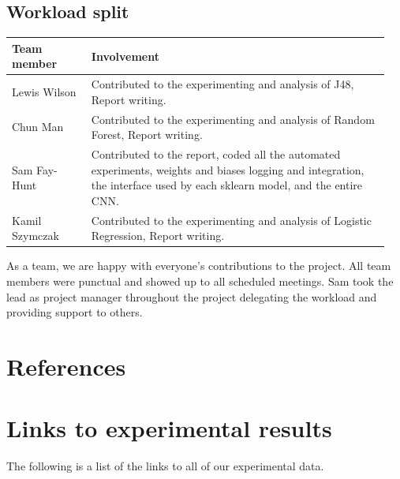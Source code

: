 \documentclass[11pt]{article}
\begin{document}
\subsection{Workload split}
  
  \begin{table}[ht]
    \centering
    \begin{tabular}{|p{0.2\linewidth} | p{0.75\linewidth}|} 
      \hline
      \textbf{Team member}  & \textbf{Involvement} \\ \hline
      Lewis Wilson & Contributed to the experimenting and analysis of J48, Report writing. \\ \hline
      Chun Man & Contributed to the experimenting and analysis of Random Forest, Report writing. \\ \hline
      Sam Fay-Hunt & Contributed to the report, coded all the automated experiments, weights and biases logging and integration, the interface used by each sklearn model, and the entire CNN. \\ \hline
      Kamil Szymczak & Contributed to the experimenting and analysis of Logistic Regression, Report writing. \\ \hline
    \end{tabular}
  \end{table}\label{ContributionTab}

As a team, we are happy with everyone's contributions to the project. All team members were punctual and showed up to all scheduled meetings. Sam took the lead as project manager throughout the project delegating the workload and providing support to others.

\newpage
\section{References}
\printbibliography

\newpage
\section{Links to experimental results}
The following is a list of the links to all of our experimental data.
\end{document}
